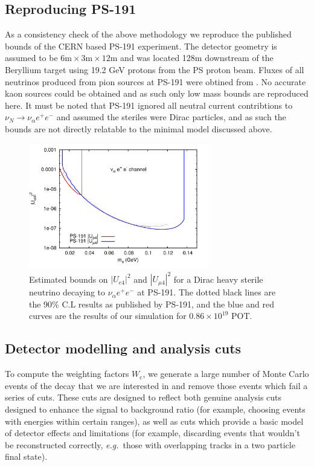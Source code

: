 \documentclass[11pt, a4paper]{article}
\def\eg{\emph{e.g.}}
\begin{document}
\subsection{Reproducing PS-191}
As a consistency check of the above methodology we reproduce the published bounds of the CERN based PS-191 experiment. The detector geometry is assumed to be $6\text{m} \times 3\text{m} \times 12 \text{m}$ and was located 128m downstream of the Beryllium target using 19.2 GeV protons from the PS proton beam. 
Fluxes of all neutrinos produced from pion sources at PS-191 were obtined from \cite{ps191THesis}. No accurate kaon sources could be obtained and as such only low mass bounds are reproduced here. It must be noted that PS-191 ignored all neutral current contribtions to $\nu_N \rightarrow \nu_\alpha e^+ e^-$ and assumed the steriles were Dirac particles, and as such the bounds are not directly relatable to the minimal model discussed above.


\begin{figure}
\center
\includegraphics[width=0.7\textwidth]{figures/PS-191_test.pdf}
\caption{\label{fig:ps191test} Estimated bounds on $|U_{e4}|^2$ and $|U_{\mu 4}|^2$ for a Dirac heavy sterile neutrino decaying to $\nu_\alpha e^+ e^-$ at PS-191. The dotted black lines are the 90\% C.L results as published by PS-191, and the blue and red curves are the results of our simulation for $0.86 \times 10^{19}$ POT.}
\end{figure}

\subsection{Detector modelling and analysis cuts}

To compute the weighting factors $W_\text{c}$, we generate a large number of
Monte Carlo events of the decay that we are interested in and remove those
events which fail a series of cuts. These cuts are designed to reflect both
genuine analysis cuts designed to enhance the signal to background ratio (for
example, choosing events with energies within certain ranges), as well as cuts
which provide a basic model of detector effects and limitations (for example,
discarding events that wouldn't be reconstructed correctly, \eg\ those with
overlapping tracks in a two particle final state).
\end{document}
